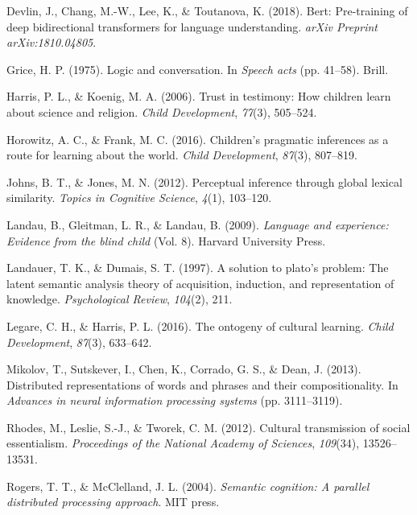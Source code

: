\documentclass[10pt, letterpaper]{article}
\begin{document}
\leavevmode\hypertarget{ref-devlin2018}{}%
Devlin, J., Chang, M.-W., Lee, K., \& Toutanova, K. (2018). Bert:
Pre-training of deep bidirectional transformers for language
understanding. \emph{arXiv Preprint arXiv:1810.04805}.

\leavevmode\hypertarget{ref-grice1975}{}%
Grice, H. P. (1975). Logic and conversation. In \emph{Speech acts} (pp.
41--58). Brill.

\leavevmode\hypertarget{ref-harris2006}{}%
Harris, P. L., \& Koenig, M. A. (2006). Trust in testimony: How children
learn about science and religion. \emph{Child Development},
\emph{77}(3), 505--524.

\leavevmode\hypertarget{ref-horowitz2016}{}%
Horowitz, A. C., \& Frank, M. C. (2016). Children's pragmatic inferences
as a route for learning about the world. \emph{Child Development},
\emph{87}(3), 807--819.

\leavevmode\hypertarget{ref-johns2012}{}%
Johns, B. T., \& Jones, M. N. (2012). Perceptual inference through
global lexical similarity. \emph{Topics in Cognitive Science},
\emph{4}(1), 103--120.

\leavevmode\hypertarget{ref-landau2009}{}%
Landau, B., Gleitman, L. R., \& Landau, B. (2009). \emph{Language and
experience: Evidence from the blind child} (Vol. 8). Harvard University
Press.

\leavevmode\hypertarget{ref-landauer1997}{}%
Landauer, T. K., \& Dumais, S. T. (1997). A solution to plato's problem:
The latent semantic analysis theory of acquisition, induction, and
representation of knowledge. \emph{Psychological Review}, \emph{104}(2),
211.

\leavevmode\hypertarget{ref-legare2016}{}%
Legare, C. H., \& Harris, P. L. (2016). The ontogeny of cultural
learning. \emph{Child Development}, \emph{87}(3), 633--642.

\leavevmode\hypertarget{ref-mikolov2013}{}%
Mikolov, T., Sutskever, I., Chen, K., Corrado, G. S., \& Dean, J.
(2013). Distributed representations of words and phrases and their
compositionality. In \emph{Advances in neural information processing
systems} (pp. 3111--3119).

\leavevmode\hypertarget{ref-rhodes2012}{}%
Rhodes, M., Leslie, S.-J., \& Tworek, C. M. (2012). Cultural
transmission of social essentialism. \emph{Proceedings of the National
Academy of Sciences}, \emph{109}(34), 13526--13531.

\leavevmode\hypertarget{ref-rogers2004}{}%
Rogers, T. T., \& McClelland, J. L. (2004). \emph{Semantic cognition: A
parallel distributed processing approach}. MIT press.
\end{document}
